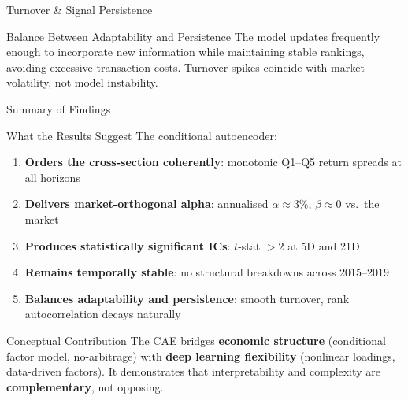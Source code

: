 \documentclass[aspectratio=169, 11pt]{beamer}
\begin{document}
%
%
\begin{frame}{Turnover \& Signal Persistence}

\begin{exampleblock}{Balance Between Adaptability and Persistence}
The model updates frequently enough to incorporate new information while maintaining stable rankings, avoiding excessive transaction costs. Turnover spikes coincide with market volatility, not model instability.
\end{exampleblock}

\end{frame}
%
%
\begin{frame}{Summary of Findings}

\begin{block}{What the Results Suggest}
The conditional autoencoder:
\begin{enumerate}
  \item \textbf{Orders the cross-section coherently}: monotonic Q1--Q5 return spreads at all horizons
  \item \textbf{Delivers market-orthogonal alpha}: annualised $\alpha \approx 3\%$, $\beta \approx 0$ vs.\ the market
  \item \textbf{Produces statistically significant ICs}: $t$-stat $> 2$ at 5D and 21D
  \item \textbf{Remains temporally stable}: no structural breakdowns across 2015--2019
  \item \textbf{Balances adaptability and persistence}: smooth turnover, rank autocorrelation decays naturally
\end{enumerate}
\end{block}

\vspace{0.2cm}

\begin{block}{Conceptual Contribution}
The CAE bridges \textbf{economic structure} (conditional factor model, no-arbitrage) with \textbf{deep learning flexibility} (nonlinear loadings, data-driven factors). It demonstrates that interpretability and complexity are \textbf{complementary}, not opposing.
\end{block}

\end{frame}
%
%
\end{document}

